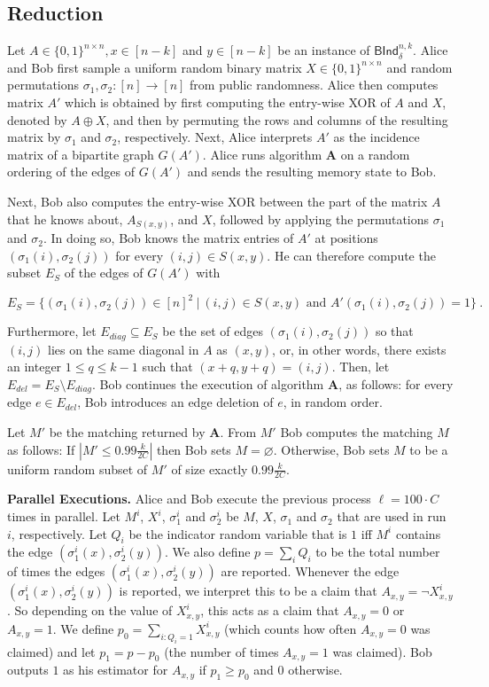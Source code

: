 \subsection{Reduction}
Let $A \in \{0, 1\}^{n \times n}, x \in [n-k]$ and  $y \in [n-k]$ be an instance of $\textsf{BInd}^{n,k}_{\delta}$. 
Alice and Bob first sample a uniform random binary matrix $X \in \{0,1\}^{n \times n}$ 
and random permutations $\sigma_1, \sigma_2: [n] \rightarrow [n]$ from public randomness. Alice then computes matrix 
$A'$ which is obtained by first computing the entry-wise XOR of $A$ and $X$, denoted by $A \oplus X$, 
and then by permuting the rows and columns
of the resulting matrix by $\sigma_1$ and $\sigma_2$, respectively. Next, Alice interprets $A'$ as the incidence matrix
of a bipartite graph $G(A')$. Alice runs algorithm $\mathbf{A}$ on a random ordering of the edges of $G(A')$ and sends
the resulting memory state to Bob.

Next, Bob also computes the entry-wise XOR between the part of the matrix $A$ that he knows about, $A_{S(x,y)}$, and $X$, followed by applying
the permutations $\sigma_1$ and $\sigma_2$. In doing so, Bob knows the matrix entries of $A'$ at positions 
$(\sigma_1(i), \sigma_2(j))$
for every $(i,j) \in S(x,y)$. He can therefore compute the subset $E_S$ of the edges of $G(A')$ with

$$E_S = \{(\sigma_1(i),\sigma_2(j)) \in [n]^2 \ | \ (i,j) \in S(x,y) \mbox{ and } A'(\sigma_1(i),\sigma_2(j)) = 1  \} \ .$$

Furthermore, let $E_{diag} \subseteq E_S$ be the set of edges $(\sigma_1(i), \sigma_2(j))$ so that $(i,j)$ lies on the same
diagonal in $A$ as $(x,y)$, or, in other words, there exists an integer $1 \le q \le k-1$ such that $(x+q, y+q) = (i, j)$.
Then, let $E_{del} = E_S \setminus E_{diag}$.
Bob continues the execution of algorithm $\mathbf{A}$, as follows: for every edge $e \in E_{del}$, 
Bob introduces an edge deletion of $e$, in random order.

%
%
%
Let $M'$ be the matching returned by $\mathbf{A}$.
From $M'$ Bob computes the matching $M$ as follows: If $|M' \le 0.99 \frac{k}{2C}|$ then Bob sets $M = \varnothing$.
%
%
Otherwise, Bob sets $M$ to be a uniform random subset of $M'$ of size exactly $0.99 \frac{k}{2C}$.

\textbf{Parallel Executions.} Alice and Bob execute the previous process $\ell = 100 \cdot C$ times in parallel. Let $M^i$, $X^i$, 
$\sigma_1^i$ and $\sigma_2^i$ be $M$, $X$, $\sigma_1$ and $\sigma_2$ that are used in run $i$, respectively.
%
Let $Q_i$ be the indicator random variable that is $1$ iff $M^i$ contains the edge $(\sigma^i_1(x), \sigma^i_2(y))$. 
We also define $p = \sum_i Q_i$ to be the total number of times the edges $(\sigma^i_1(x), \sigma^i_2(y))$ are reported. 
Whenever the edge $(\sigma^i_1(x), \sigma^i_2(y))$ is reported, we interpret this to be a claim that $A_{x,y} = \neg X^i_{x,y}$. So depending on the value of $X^i_{x,y}$, this acts as a claim that $A_{x,y} = 0$ or $A_{x,y} = 1$. We define $p_0 = \sum_{i: Q_i = 1} X^i_{x, y}$ (which counts how often
$A_{x,y} = 0$ was claimed) and let $p_1 = p - p_0$ (the number of times $A_{x,y} = 1$ was claimed). Bob outputs $1$ as his estimator for $A_{x,y}$ if $p_1 \ge p_0$ 
and $0$ otherwise.


